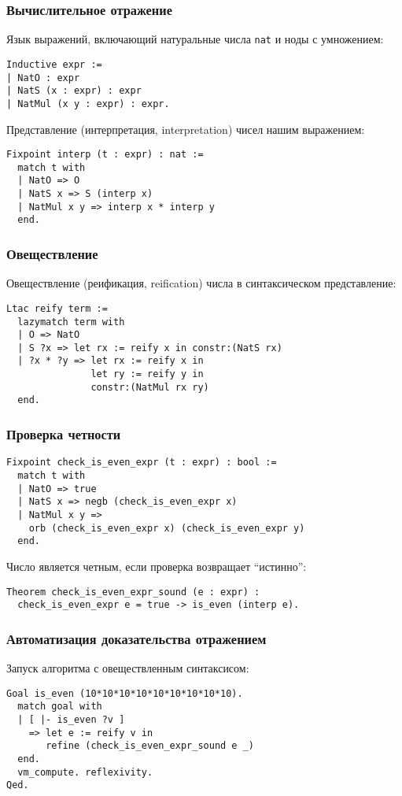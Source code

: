 \documentclass{beamer}
\begin{document}
\begin{frame}[fragile]
  \frametitle{Вычислительное отражение}
  \vspace{-.5em}
  Язык выражений, включающий натуральные числа \texttt{nat} и ноды с умножением:
\begin{verbatim}
Inductive expr :=
| NatO : expr
| NatS (x : expr) : expr
| NatMul (x y : expr) : expr.
\end{verbatim}
  Представление (интерпретация, interpretation) чисел нашим выражением:
\begin{verbatim}
Fixpoint interp (t : expr) : nat :=
  match t with
  | NatO => O
  | NatS x => S (interp x)
  | NatMul x y => interp x * interp y
  end.
\end{verbatim}
\end{frame}

\begin{frame}[fragile]
  \frametitle{Овеществление}
  Овеществление (реификация, reification) числа в синтаксическом представление:
\begin{verbatim}
Ltac reify term :=
  lazymatch term with
  | O => NatO
  | S ?x => let rx := reify x in constr:(NatS rx)
  | ?x * ?y => let rx := reify x in
               let ry := reify y in
               constr:(NatMul rx ry)
  end.
\end{verbatim}
\end{frame}

\begin{frame}[fragile]
  \frametitle{Проверка четности}
\begin{verbatim}
Fixpoint check_is_even_expr (t : expr) : bool :=
  match t with
  | NatO => true
  | NatS x => negb (check_is_even_expr x)
  | NatMul x y =>
    orb (check_is_even_expr x) (check_is_even_expr y)
  end.
\end{verbatim}
  Число является четным, если проверка возвращает ``истинно'':
\begin{verbatim}
Theorem check_is_even_expr_sound (e : expr) :
  check_is_even_expr e = true -> is_even (interp e).
\end{verbatim}
\end{frame}

\begin{frame}[fragile]
  \frametitle{Автоматизация доказательства отражением}
  Запуск алгоритма с овеществленным синтаксисом:
\begin{verbatim}
Goal is_even (10*10*10*10*10*10*10*10*10).
  match goal with
  | [ |- is_even ?v ]
    => let e := reify v in
       refine (check_is_even_expr_sound e _)
  end.
  vm_compute. reflexivity.
Qed.
\end{verbatim}
\end{frame}
\end{document}

